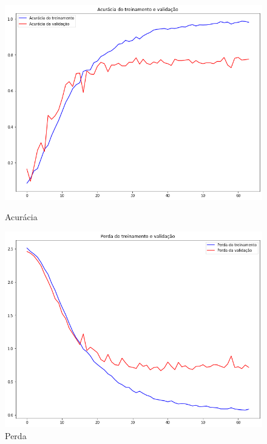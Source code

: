 \documentclass[12pt]{article}
\begin{document}
\begin{figure}[!htb]
  \begin{minipage}{.47\textwidth}
    \centering
    \includegraphics[width=1.1\linewidth]{experiments/default_noaug_64/accuracy.png}
    \caption{Acurácia}\label{fig:experiment_default_noaug_64_accuracy}
  \end{minipage}\hfill
  \begin{minipage}{.47\textwidth}
    \centering
    \includegraphics[width=1.1\linewidth]{experiments/default_noaug_64/loss.png}
    \caption{Perda}\label{fig:experiment_default_noaug_64_loss}
  \end{minipage}
\end{figure}
\end{document}
